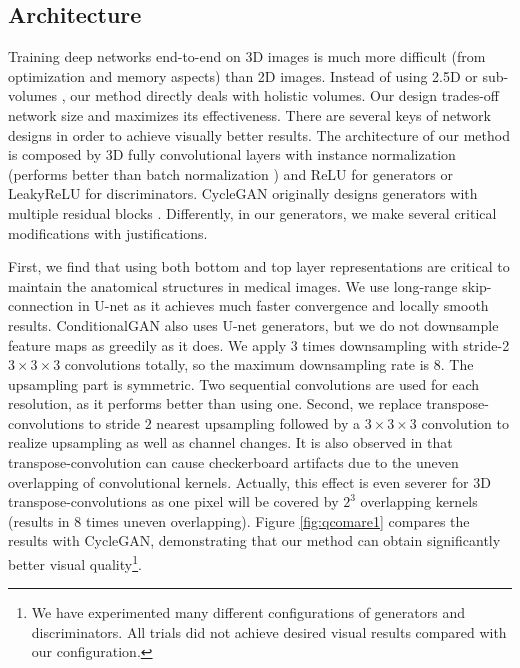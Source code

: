 \documentclass[10pt,twocolumn,letterpaper]{article}
\begin{document}
\subsection{Architecture}
Training deep networks end-to-end on 3D images is much more difficult (from optimization and memory aspects) than 2D images. 
Instead of using 2.5D \cite{roth2014new} or sub-volumes \cite{kamnitsas2017unsupervised}, our method directly deals with holistic volumes. Our design trades-off network size and maximizes its effectiveness.
There are several keys of network designs in order to achieve visually better results. 
The architecture of our method is composed by 3D fully convolutional layers with instance normalization \cite{ulyanov2016instance} (performs better than batch normalization \cite{ioffe2015batch}) and ReLU for generators or LeakyReLU for discriminators. 
CycleGAN originally designs generators with multiple residual blocks \cite{he2016deep}.
Differently, in our generators, we make several critical modifications with justifications.

First, we find that using both bottom and top layer representations are critical to maintain the anatomical structures in medical images. We use long-range skip-connection in U-net \cite{ronneberger2015u} as it achieves much faster convergence and locally smooth results. ConditionalGAN also uses U-net generators, but we do not downsample feature maps as greedily as it does. We apply $3$ times downsampling with stride-2 $3{\times}3{\times}3$ convolutions totally, so the maximum downsampling rate is $8$. The upsampling part is symmetric. Two sequential convolutions are used for each resolution, as it performs better than using one.
Second, we replace transpose-convolutions to stride $2$ nearest upsampling followed by a $3{\times}3{\times}3$ convolution to realize upsampling as well as channel changes. It is also observed in \cite{odena2016deconvolution} that transpose-convolution can cause checkerboard artifacts due to the uneven overlapping of convolutional kernels. Actually, this effect is even severer for 3D transpose-convolutions as one pixel will be covered by $2^3$ overlapping kernels (results in 8 times uneven overlapping).  Figure \ref{fig:qcomare1} compares the results with CycleGAN, demonstrating that our method can obtain significantly better visual quality\footnote{We have experimented many different configurations of generators and discriminators. All trials did not achieve desired visual results compared with our configuration. }. 
\end{document}
